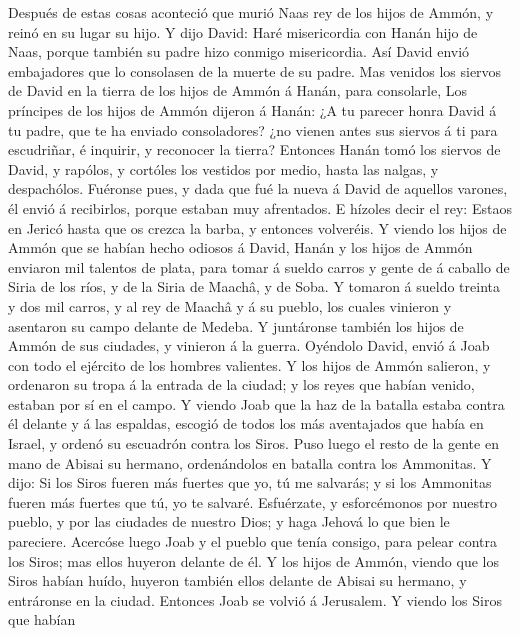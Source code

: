  Después de estas cosas aconteció que murió Naas rey de los
hijos de Ammón, y reinó en su lugar su hijo.  Y dijo David:
Haré misericordia con Hanán hijo de Naas, porque también su padre hizo
conmigo misericordia. Así David envió embajadores que lo consolasen de
la muerte de su padre. Mas venidos los siervos de David en la tierra de
los hijos de Ammón á Hanán, para consolarle,  Los príncipes
de los hijos de Ammón dijeron á Hanán: ¿A tu parecer honra David á tu
padre, que te ha enviado consoladores? ¿no vienen antes sus siervos á ti
para escudriñar, é inquirir, y reconocer la tierra? 
Entonces Hanán tomó los siervos de David, y rapólos, y cortóles los
vestidos por medio, hasta las nalgas, y despachólos. 
Fuéronse pues, y dada que fué la nueva á David de aquellos varones, él
envió á recibirlos, porque estaban muy afrentados. E hízoles decir el
rey: Estaos en Jericó hasta que os crezca la barba, y entonces
volveréis.  Y viendo los hijos de Ammón que se habían hecho
odiosos á David, Hanán y los hijos de Ammón enviaron mil talentos de
plata, para tomar á sueldo carros y gente de á caballo de Siria de los
ríos, y de la Siria de Maachâ, y de Soba.  Y tomaron á
sueldo treinta y dos mil carros, y al rey de Maachâ y á su pueblo, los
cuales vinieron y asentaron su campo delante de Medeba. Y juntáronse
también los hijos de Ammón de sus ciudades, y vinieron á la guerra.
 Oyéndolo David, envió á Joab con todo el ejército de los
hombres valientes.  Y los hijos de Ammón salieron, y
ordenaron su tropa á la entrada de la ciudad; y los reyes que habían
venido, estaban por sí en el campo.  Y viendo Joab que la
haz de la batalla estaba contra él delante y á las espaldas, escogió de
todos los más aventajados que había en Israel, y ordenó su escuadrón
contra los Siros.  Puso luego el resto de la gente en mano
de Abisai su hermano, ordenándolos en batalla contra los Ammonitas.
 Y dijo: Si los Siros fueren más fuertes que yo, tú me
salvarás; y si los Ammonitas fueren más fuertes que tú, yo te salvaré.
 Esfuérzate, y esforcémonos por nuestro pueblo, y por las
ciudades de nuestro Dios; y haga Jehová lo que bien le pareciere.
 Acercóse luego Joab y el pueblo que tenía consigo, para
pelear contra los Siros; mas ellos huyeron delante de él. 
Y los hijos de Ammón, viendo que los Siros habían huído, huyeron también
ellos delante de Abisai su hermano, y entráronse en la ciudad. Entonces
Joab se volvió á Jerusalem.  Y viendo los Siros que habían
